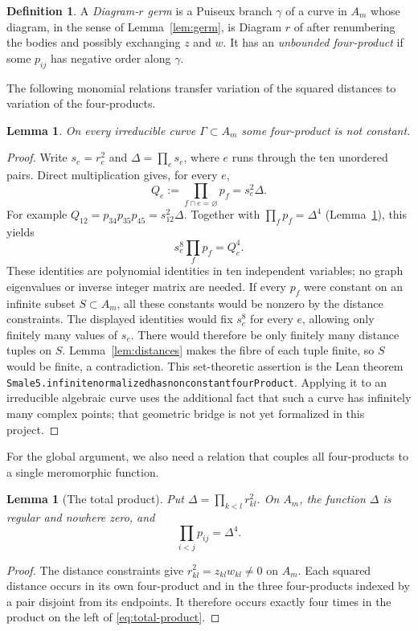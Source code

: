 \documentclass[Threeside,11pt]{article}
\newtheorem{lemma}[theorem]{Lemma}
\theoremstyle{definition}
\newtheorem{definition}[theorem]{Definition}
\theoremstyle{remark}
\numberwithin{equation}{section}
\theoremstyle{remark}
\newcommand{\code}[1]{\begingroup\def\_{\textunderscore\allowbreak}\texttt{#1}\endgroup}
\begin{document}
\begin{definition}\label{def:germ}
A \emph{Diagram-$r$ germ} is a Puiseux branch $\gamma$ of a curve in $A_m$ whose diagram, in the
sense of Lemma~\ref{lem:germ}, is Diagram $r$ of \cite[Fig.~11]{AK} after renumbering the bodies
and possibly exchanging $z$ and $w$.  It has an \emph{unbounded four-product} if some $p_{ij}$ has
negative order along $\gamma$.
\end{definition}

The following monomial relations transfer variation of the squared distances to variation
of the four-products.

\begin{lemma}\label{lem:petersen}
On every irreducible curve $\Gamma\subset A_m$ some four-product is not constant.
\end{lemma}
\begin{proof}
Write $s_e=r_e^2$ and $\Delta=\prod_es_e$, where $e$ runs through the ten
unordered pairs. Direct multiplication gives, for every $e$,
\[
 Q_e:=\prod_{f\cap e=\varnothing}p_f=s_e^2\Delta.
\]
For example $Q_{12}=p_{34}p_{35}p_{45}=s_{12}^2\Delta$.
Together with $\prod_fp_f=\Delta^4$ (Lemma~\ref{lem:total-product}), this yields
\[
 s_e^8\prod_fp_f=Q_e^4.
\]
These identities are polynomial identities in ten independent variables;
no graph eigenvalues or inverse integer matrix are needed.
If every $p_f$ were constant on an infinite subset $S\subset A_m$, all these
constants would be nonzero by the distance constraints. The displayed identities
would fix $s_e^8$ for every $e$, allowing only finitely many values of $s_e$.
There would therefore be only finitely many distance tuples on $S$.
Lemma~\ref{lem:distances} makes the fibre of each tuple finite, so $S$ would be
finite, a contradiction. This set-theoretic assertion is the Lean theorem
\code{Smale5.infinite\_normalized\_has\_nonconstant\_fourProduct}.
Applying it to an irreducible algebraic curve uses the additional fact that
such a curve has infinitely many complex points; that geometric bridge is
not yet formalized in this project.
\end{proof}
For the global argument, we also need a relation that couples all four-products to a
single meromorphic function.

{
\begin{lemma}[The total product]\label{lem:total-product}
Put $\Delta=\prod_{k<l}r_{kl}^2$.  On $A_m$, the function $\Delta$ is regular and nowhere zero,
and
\begin{equation}\label{eq:total-product}
  \prod_{i<j}p_{ij}=\Delta^4.
\end{equation}
\end{lemma}
\begin{proof}
The distance constraints give $r_{kl}^2=z_{kl}w_{kl}\ne0$ on $A_m$.  Each squared distance occurs in its own
four-product and in the three four-products indexed by a pair disjoint from its endpoints.
It therefore occurs exactly four times in the product on the left of \eqref{eq:total-product}.
\end{proof}
}
\end{document}
